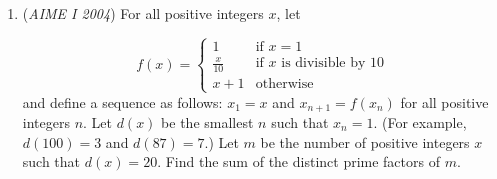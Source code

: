 \begin{enumerate}
	\item (\textit{AIME I 2004}) For all positive integers $x$, let

 \[f(x)=\begin{cases}1 &\mbox{if }x = 1\\ \frac x{10} &\mbox{if }x\mbox{ is divisible by 10}\\ x+1 &\mbox{otherwise}\end{cases}\]
and define a sequence as follows: $x_1=x$ and $x_{n+1}=f(x_n)$ for all positive integers $n$. Let $d(x)$ be the smallest $n$ such that $x_n=1$. (For example, $d(100)=3$ and $d(87)=7$.) Let $m$ be the number of positive integers $x$ such that $d(x)=20$. Find the sum of the distinct prime factors of $m$.


 

\end{enumerate}